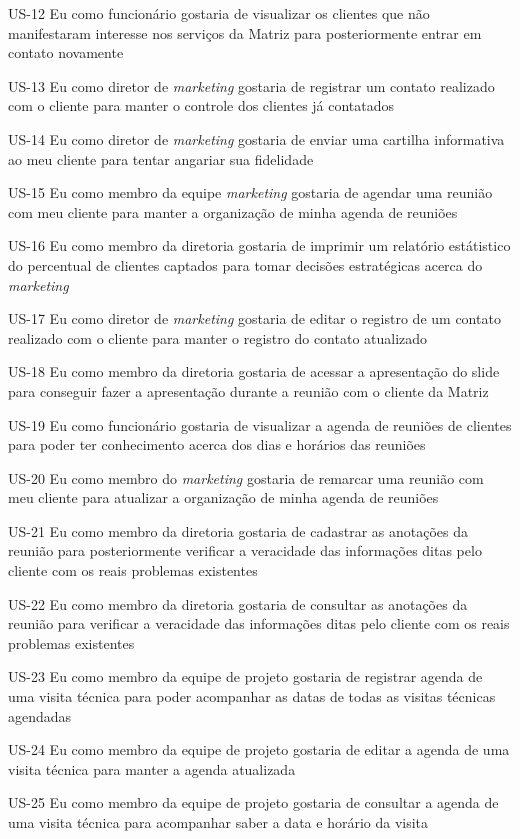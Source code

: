 US-12 Eu como funcionário gostaria de visualizar os clientes que não manifestaram interesse nos serviços da Matriz para posteriormente entrar em contato novamente


US-13 Eu como diretor de \textit{marketing} gostaria de registrar um contato realizado com o cliente para manter o controle dos clientes já contatados


US-14 Eu como diretor de \textit{marketing} gostaria de enviar uma cartilha informativa ao meu cliente para tentar angariar sua fidelidade


US-15 Eu como membro da equipe \textit{marketing} gostaria de agendar uma reunião com meu cliente para manter a organização de minha agenda de reuniões


US-16 Eu como membro da diretoria gostaria de imprimir um relatório estátistico do percentual de clientes captados para tomar decisões estratégicas acerca do \textit{marketing}


US-17 Eu como diretor de \textit{marketing} gostaria de editar o registro de um contato realizado com o cliente para manter o registro do contato atualizado


US-18 Eu como membro da diretoria gostaria de acessar a apresentação do slide para conseguir fazer a apresentação durante a reunião com o cliente da Matriz


US-19 Eu como funcionário gostaria de visualizar a agenda de reuniões de clientes para poder ter conhecimento acerca dos dias e horários das reuniões


US-20 Eu como membro do \textit{marketing} gostaria de remarcar uma reunião com meu cliente para atualizar a organização de minha agenda de reuniões


US-21 Eu como membro da diretoria gostaria de cadastrar as anotações da reunião para posteriormente verificar a veracidade das informações ditas pelo cliente com os reais problemas existentes


US-22 Eu como membro da diretoria gostaria de consultar as anotações da reunião para verificar a veracidade das informações ditas pelo cliente com os reais problemas existentes


US-23 Eu como membro da equipe de projeto gostaria de registrar agenda de uma visita técnica para poder acompanhar as datas de todas as visitas técnicas agendadas


US-24 Eu como membro da equipe de projeto gostaria de editar a agenda de uma visita técnica para manter a agenda atualizada


US-25 Eu como membro da equipe de projeto gostaria de consultar a agenda de uma visita técnica para acompanhar saber a data e horário da visita


